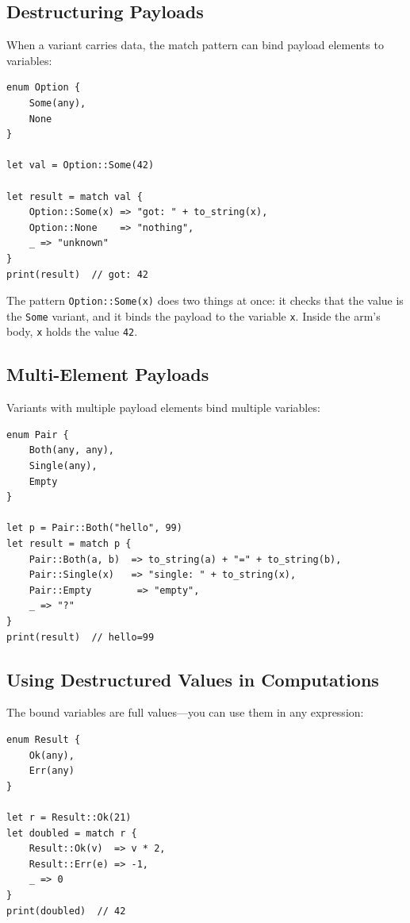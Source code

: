 \subsection{Destructuring Payloads}

When a variant carries data, the match pattern can bind payload elements
to variables:

\begin{lstlisting}[language=Lattice, caption={Destructuring enum payloads}]
enum Option {
    Some(any),
    None
}

let val = Option::Some(42)

let result = match val {
    Option::Some(x) => "got: " + to_string(x),
    Option::None    => "nothing",
    _ => "unknown"
}
print(result)  // got: 42
\end{lstlisting}

The pattern \lstinline|Option::Some(x)| does two things at once: it checks
that the value is the \lstinline|Some| variant, and it binds the payload to
the variable \lstinline|x|. Inside the arm's body, \lstinline|x| holds the
value \lstinline|42|.

\subsection{Multi-Element Payloads}

Variants with multiple payload elements bind multiple variables:

\begin{lstlisting}[language=Lattice, caption={Multi-binding destructuring}]
enum Pair {
    Both(any, any),
    Single(any),
    Empty
}

let p = Pair::Both("hello", 99)
let result = match p {
    Pair::Both(a, b)  => to_string(a) + "=" + to_string(b),
    Pair::Single(x)   => "single: " + to_string(x),
    Pair::Empty        => "empty",
    _ => "?"
}
print(result)  // hello=99
\end{lstlisting}

\subsection{Using Destructured Values in Computations}

The bound variables are full values---you can use them in any expression:

\begin{lstlisting}[language=Lattice, caption={Computing with destructured values}]
enum Result {
    Ok(any),
    Err(any)
}

let r = Result::Ok(21)
let doubled = match r {
    Result::Ok(v)  => v * 2,
    Result::Err(e) => -1,
    _ => 0
}
print(doubled)  // 42
\end{lstlisting}

